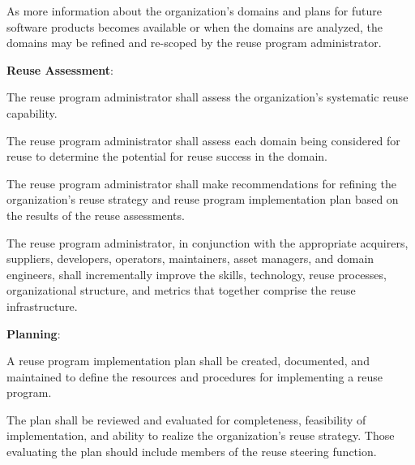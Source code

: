 \begin{adjustwidth}{2em}{0pt}
\begin{compactenum}
\begin{compactenum}
						\item As more information about the organization’s domains and plans for future software products becomes available or when the domains are analyzed, the domains may be refined and re-scoped by the reuse program administrator.

					\end{compactenum}

					\item {\bf Reuse Assessment}:

					\begin{compactenum}

						\item The reuse program administrator shall assess the organization’s systematic reuse capability.

						\item The reuse program administrator shall assess each domain being considered for reuse to determine the potential for reuse success in the domain.

						\item The reuse program administrator shall make recommendations for refining the organization’s reuse strategy and reuse program implementation plan based on the results of the reuse assessments.

						\item The reuse program administrator, in conjunction with the appropriate acquirers, suppliers, developers, operators, maintainers, asset managers, and domain engineers, shall incrementally improve the skills, technology, reuse processes, organizational structure, and metrics that together comprise the reuse infrastructure.

					\end{compactenum}

					\item {\bf Planning}:

					\begin{compactenum}

						\item A reuse program implementation plan shall be created, documented, and maintained to define the resources and procedures for implementing a reuse program.

						\item The plan shall be reviewed and evaluated for completeness, feasibility of implementation, and ability to realize the organization's reuse strategy. Those evaluating the plan should include members of the reuse steering function.


\end{compactenum}
\end{compactenum}
\end{adjustwidth}
